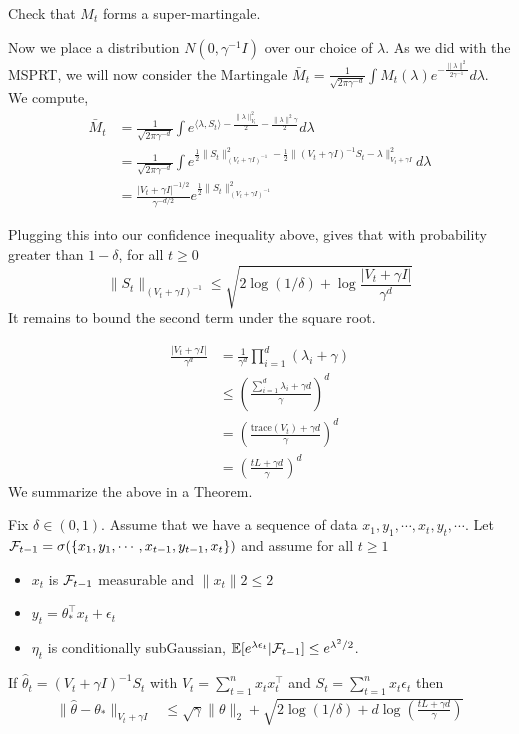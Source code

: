\exercise Check that $M_t$ forms a super-martingale. 

Now we place a distribution $N(0, \gamma^{-1}I)$ over our choice of $\lambda$. As we did with the MSPRT, we will now consider the Martingale $\bar{M}_t = \frac{1}{\sqrt{2\pi\gamma^{-d}}}\int M_t(\lambda) e^{-\frac{\|\lambda\|^2}{2\gamma^{-1}}} d\lambda$. We compute,
\begin{align*}
    \bar{M}_t 
    &= \frac{1}{\sqrt{2\pi\gamma^{-d}}}\int  e^{\langle\lambda, S_t\rangle -\frac{\|\lambda\|_{V_t}^2}{2}-\frac{\|\lambda\|^2\gamma}{2}} d\lambda\\
    &= \frac{1}{\sqrt{2\pi\gamma^{-d}}}\int e^{\frac{1}{2}\|S_t\|^2_{(V_t + \gamma I)^{-1}} - \frac{1}{2}\|(V_t + \gamma I)^{-1} S_t - \lambda\|^2_{V_t + \gamma I}} d\lambda\\
    &= \frac{|V_t + \gamma I|^{-1/2}}{\gamma^{-d/2}} e^{\frac{1}{2}\|S_t\|^2_{(V_t +\gamma I )^{-1}}} 
\end{align*}

Plugging this into our confidence inequality above, gives that with probability greater than $1-\delta$, for all $t\geq 0$
\[\|S_t\|_{(V_t + \gamma I)^{-1}} \leq \sqrt{2\log(1/\delta) + \log{\frac{|V_t + \gamma I|}{\gamma^d}}}\]
It remains to bound the second term under the square root. 

\begin{align*}
    \frac{|V_t + \gamma I|}{\gamma^d}
    &= \frac{1}{\gamma^d}\prod_{i=1}^d (\lambda_i + \gamma)\\
    &\leq \left(\frac{\sum_{i=1}^d \lambda_i +\gamma d}{\gamma}\right)^d\\
    &= \left(\frac{\text{trace}(V_t) +\gamma d}{\gamma}\right)^d\\
    &= \left(\frac{t L +\gamma d}{\gamma}\right)^d
\end{align*}
We summarize the above in a Theorem. 

\begin{theorem}\label{thm:lsqtsq}
    Fix $\delta \in (0,1)$. Assume that we have a sequence of data $x_1, y_1, \cdots, x_t, y_t, \cdots$. Let $\mathcal{F}_{t-1} = \sigma(\{x_1, y_1, \cdots, x_{t-1}, y_{t-1}, x_t\})$ and assume for all $t\geq 1$
    \begin{itemize}
    \item $x_t$ is $\mathcal{F}_{t-1}$ measurable and $\|x_t\|2\leq 2$
    \item $y_t = \theta_{\ast}^{\top} x_t + \epsilon_t$ 
    \item $\eta_t$ is conditionally subGaussian, $\mathbb{E}[e^{\lambda\epsilon_t}|\mathcal{F}_{t-1}]\leq e^{\lambda^2/2}$.  
    \end{itemize}
    If $\hat{\theta}_t = (V_t + \gamma I)^{-1} S_t$ with $V_t = \sum_{t=1}^n x_t x_t^{\top}$ and $S_t = \sum_{t=1}^n x_t \epsilon_t$ then 
    \begin{align*}
        \|\hat{\theta} - \theta_{\ast}\|_{V_t + \gamma I}
        &\leq \sqrt{\gamma}\|\theta\|_{2} +
        \sqrt{2\log(1/\delta) + d\log\left(\frac{t L + \gamma d}{\gamma}\right)}
    \end{align*}
    
\end{theorem}



